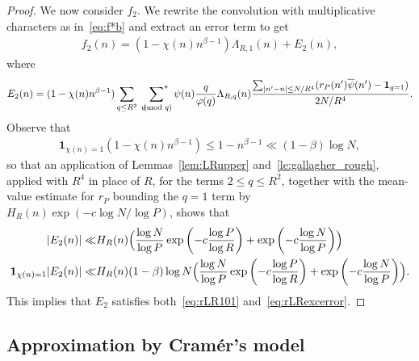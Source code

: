 \documentclass[12pt]{amsart}
\theoremstyle{definition}
\theoremstyle{remark}
\numberwithin{equation}{section}
\newcommand{\asum}{\sideset{}{^{\ast}}\sum}
\newcommand{\1}{\mathbf{1}}
\let\oldpmod\pmod
\renewcommand{\pmod}[1]{\hspace{-0.12cm}\oldpmod {#1}}
\begin{document}
\begin{proof}
    We now consider $f_2$. We rewrite the convolution with multiplicative characters as in~\eqref{eq:f*b} and extract an error term to get
    \begin{align}\label{eq:roughapproxf2exp}
        f_2(n)=(1-\chi(n)n^{\beta-1})\Lambda_{R,1}(n)+E_2(n),
    \end{align}
    where 
    \begin{align*}
        E_2(n)=(1-\chi(n)n^{\beta-1})\sum_{q\leq R^2}\,\,\,\asum_{\psi\pmod {q}}\psi(n)\frac{q}{\varphi(q)} \Lambda_{R,q}(n) \frac{\sum_{|n'-n|\leq N/R^4}( r_{P}(n')\overline{\psi}(n')-\1_{q=1})}{2N/R^4}.
    \end{align*}
    Observe that  \begin{align*}
        \1_{\chi(n)=1}(1-\chi(n)n^{\beta-1})\leq 1-n^{\beta-1}\ll (1-\beta)\log N,
    \end{align*}
    so that an application  of Lemmas~\ref{lem:LRupper} and~\ref{le:gallagher_rough}, applied with $R^4$ in place of $R$, for the terms $2\le q\le R^2$, together with the mean-value estimate for $r_P$ bounding the $q=1$ term by $H_R(n)\exp(-c\log N/\log P)$, shows that
    \begin{align*}
    |E_2(n)|\ll& H_R(n) \Bigl(\frac{\log N}{\log P}\exp\left(-c\frac{\log P }{\log R}\right)+\exp\left(-c\frac{\log N }{\log P}\right)\Bigr)\\
         \1_{\chi(n)=1}|E_2(n)|\ll& H_R(n) (1-\beta)\log N\Bigl(\frac{\log N}{\log P}\exp\left(-c\frac{\log P }{\log R}\right)+\exp\left(-c\frac{\log N }{\log P}\right) \Bigr).
    \end{align*}
    This implies that $E_2$ satisfies both~\eqref{eq:rLR101} and~\eqref{eq:rLRexcerror}.

\end{proof}





\subsection{Approximation by Cram\'er's model}\label{subsec:7.4}
\end{document}
